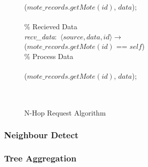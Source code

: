 \begin{figure}[H]
\begin{boxedminipage}{\linewidth}
    \null\qq\qq {}($mote\_records.getMote(id)$, $data$);\\~\\
    \null\qq \% Recieved Data\\
    \null\qq \emph{recv\_data}:~$\langle source, data, id\rangle \rightarrow$\\
    \null\qq\qq {} ($mote\_records.getMote(id)$ == $self$) \\
    \null\qq\qq\qq \% Process Data\\
    \null\qq\qq {}\\
    \null\qq\qq\qq {}($mote\_records.getMote(id)$, $data$);\\
    \null\qq\qq {}\\~\\
  \end{boxedminipage}
  \caption{N-Hop Request Algorithm}
  \label{fig:n-hop-req-algorithm}
\end{figure}

\subsubsection{Neighbour Detect}

\begin{figure}[ht!]
\centering
{}
\end{figure}

\subsubsection{Tree Aggregation}

